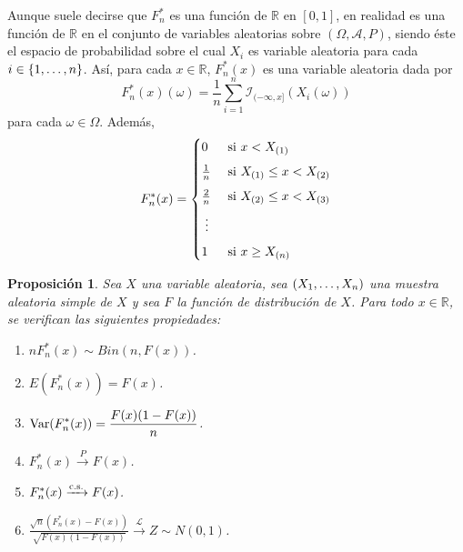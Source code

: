\documentclass[11pt]{report}
\newtheorem{proposition}{Proposición}
\theoremstyle{definition}
\newcommand{\R}{\mathbb R}
\begin{document}
Aunque suele decirse que $F_n^*$ es una función de $\R$ en $[0,1]$, en realidad es una función de $\R$ en el conjunto de variables aleatorias sobre $(\Omega, \mathcal{A},P)$, siendo éste el espacio de probabilidad sobre el cual $X_i$ es variable aleatoria para cada $i \in \{1,\mathellipsis,n\}$. Así, para cada $x \in \R$, $F_n^*(x)$ es una variable aleatoria dada por
\[F_n^*(x)(\omega) = \frac{1}{n} \sum_{i=1}^n \mathcal{I}_{(-\infty,x]}(X_i(\omega))\]
para cada $\omega \in \Omega$. Además,
\[F_n^*(x) = \begin{cases}
    0 & $ si $ x < X_{(1)} \\[5pt]
    \frac{1}{n} & $ si $ X_{(1)} \leq x < X_{(2)} \\[5pt]
    \frac{2}{n} & $ si $ X_{(2)} \leq x < X_{(3)} \\[5pt]
    \; \vdots \\[5pt]
    1 & $ si $x \geq X_{(n)} \\

\end{cases}\]

\begin{proposition}
Sea $X$ una variable aleatoria, sea $(X_1,\mathellipsis,X_n)$ una muestra aleatoria simple de $X$ y sea $F$ la función de distribución de $X$. Para todo $x \in \R$, se verifican las siguientes propiedades:
\begin{enumerate}
    \item $nF_n^*(x) \sim Bin(n,F(x))$.
    \item $E(F_n^*(x)) = F(x)$.
    \item $\displaystyle \textup{Var}(F_n^*(x))=\frac{F(x)(1-F(x))}{n}$.
    \item $F_n^*(x) \xrightarrow{P} F(x)$.
    \item $F_n^*(x) \xrightarrow{\textup{c.s.}} F(x)$.
    \item $\displaystyle \frac{\sqrt{n}(F_n^*(x)-F(x))}{\sqrt{F(x)(1-F(x))}} \xrightarrow{\mathcal{L}} Z \sim N(0,1)$.
\end{enumerate}
\end{proposition}
\end{document}
